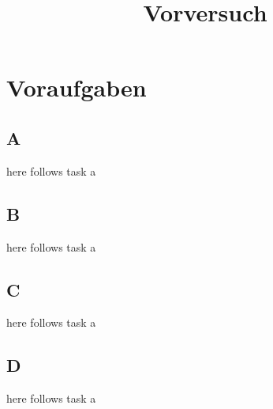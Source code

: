 

\title{Vorversuch}


\maketitle
\tableofcontents
\disclaimer

\chapter{Voraufgaben}
\section*{A}
here follows task a
\section*{B}
here follows task a
\section*{C}
here follows task a
\section*{D}
here follows task a

